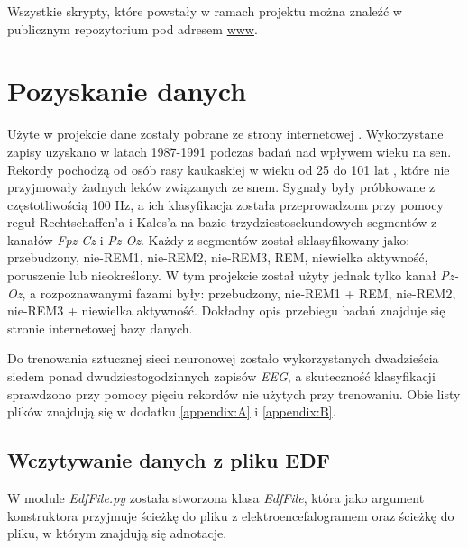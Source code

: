 \documentclass[12pt, notitlepage]{report}
\begin{document}
        Wszystkie skrypty, które powstały w ramach projektu można znaleźć w publicznym repozytorium pod adresem \url{www}. %

    \chapter{Pozyskanie danych}
        Użyte w projekcie dane zostały pobrane ze strony internetowej \cite{}. Wykorzystane zapisy uzyskano w latach 1987-1991 podczas badań nad wpływem wieku na sen. Rekordy pochodzą od osób rasy kaukaskiej w wieku od 25 do 101 lat , które nie przyjmowały żadnych leków związanych ze snem. Sygnały były próbkowane z częstotliwością 100 Hz, a ich klasyfikacja została przeprowadzona przy pomocy reguł Rechtschaffen'a i Kales'a na bazie trzydziestosekundowych segmentów z kanałów \textit{Fpz-Cz} i \textit{Pz-Oz}. Każdy z segmentów został sklasyfikowany jako: przebudzony, nie-REM1, nie-REM2, nie-REM3, REM, niewielka aktywność, poruszenie lub nieokreślony.
        W tym projekcie został użyty jednak tylko kanał \textit{Pz-Oz}, a rozpoznawanymi fazami były: przebudzony, nie-REM1 + REM, nie-REM2, nie-REM3 + niewielka aktywność.
        Dokładny opis przebiegu badań znajduje się stronie internetowej bazy danych.
        
        Do trenowania sztucznej sieci neuronowej zostało wykorzystanych dwadzieścia siedem ponad dwudziestogodzinnych zapisów \textit{EEG}, a skuteczność klasyfikacji sprawdzono przy pomocy pięciu rekordów nie użytych przy trenowaniu. Obie listy plików znajdują się w dodatku \ref{appendix:A} i \ref{appendix:B}.

        \newpage

        \section{Wczytywanie danych z pliku EDF}
            W module \textit{EdfFile.py} została stworzona klasa \textit{EdfFile}, która jako argument konstruktora przyjmuje ścieżkę do pliku z elektroencefalogramem oraz ścieżkę do pliku, w którym znajdują się adnotacje.
            
\end{document}
